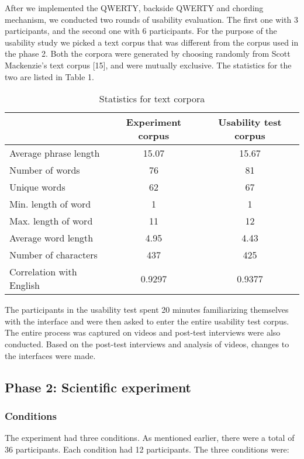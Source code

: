 After we implemented the QWERTY, backside QWERTY and chording
mechanism, we conducted two rounds of usability evaluation. The first
one with 3 participants, and the second one with 6 participants. For
the purpose of the usability study we picked a text corpus that was
different from the corpus used in the phase 2. Both the corpora were
generated by choosing randomly from Scott Mackenzie's text corpus
[15], and were mutually exclusive. The statistics for the two
are listed in Table 1.

\begin{table}
	\centering
		\begin{tabular}{|l|c|c|} \hline
		                         & Experiment corpus & Usability test corpus \\ \hline
			 Average phrase length & 15.07 & 15.67 \\ \hline
			 Number of words & 76 & 81 \\ \hline
			 Unique words & 62 & 67 \\ \hline
			 Min. length of word & 1 & 1 \\ \hline
			 Max. length of word & 11 & 12 \\ \hline
			 Average word length & 4.95 & 4.43 \\ \hline
			 Number of characters & 437 & 425 \\ \hline
			 Correlation with English & 0.9297 & 0.9377 \\ \hline
		\end{tabular}
	\caption{Statistics for text corpora}
	\label{tab:StatisticsForTextCorpora}
\end{table}

The participants in the usability test spent 20 minutes familiarizing
themselves with the interface and were then asked to enter the entire
usability test corpus. The entire process was captured on videos and
post-test interviews were also conducted. Based on the post-test
interviews and analysis of videos, changes to the interfaces were
made.

\subsection{Phase 2: Scientific experiment}
\subsubsection{Conditions}

The experiment had three conditions. As mentioned earlier, there were
a total of 36 participants. Each condition had 12 participants. The
three conditions were:

